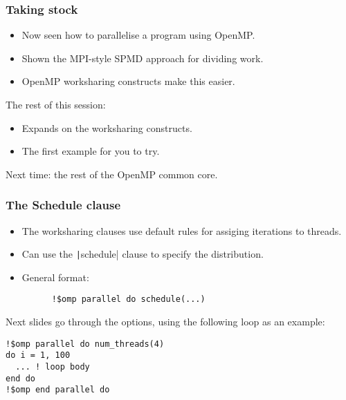 \documentclass{beamer}
\begin{document}
\begin{frame}
\frametitle{Taking stock}
\begin{itemize}
  \item Now seen how to parallelise a program using OpenMP.
  \item Shown the MPI-style SPMD approach for dividing work.
  \item OpenMP worksharing constructs make this easier.
\end{itemize}

The rest of this session:
\begin{itemize}
  \item Expands on the worksharing constructs.
  \item The first example for you to try.
\end{itemize}

Next time: the rest of the OpenMP common core.
\end{frame}

\begin{frame}[fragile]
\frametitle{The Schedule clause}
\begin{itemize}
  \item The worksharing clauses use default rules for assiging iterations to threads.
  \item Can use the \texttt|schedule| clause to specify the distribution.
  \item General format:
    \begin{verbatim}
      !$omp parallel do schedule(...)
    \end{verbatim}
\end{itemize}
Next slides go through the options, using the following loop as an example:
\begin{verbatim}
!$omp parallel do num_threads(4)
do i = 1, 100
  ... ! loop body
end do
!$omp end parallel do
\end{verbatim}

\end{frame}
\end{document}
